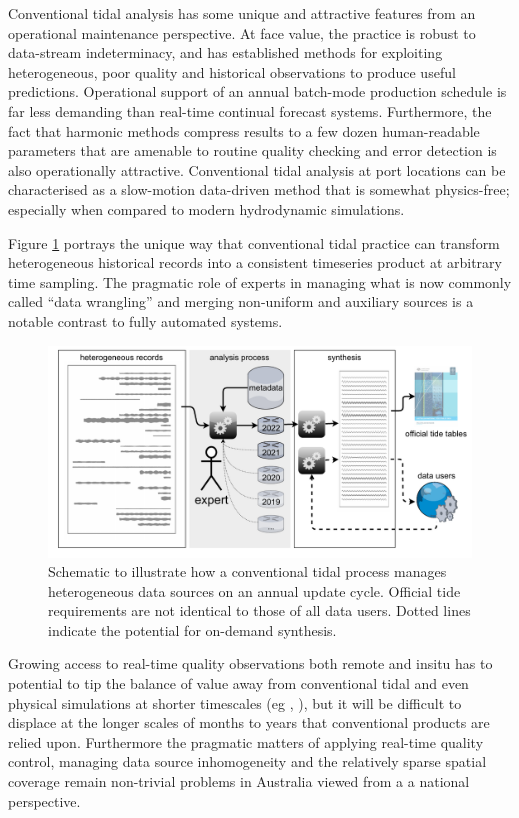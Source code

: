 Conventional tidal analysis has some unique and attractive features from an operational maintenance perspective.
At face value, the practice is robust to data-stream indeterminacy,  and has established methods for exploiting heterogeneous, poor quality and historical observations to produce useful predictions.  
Operational support of an annual batch-mode production schedule is far less demanding than real-time continual forecast systems. 
Furthermore, the fact that harmonic methods compress results to a few dozen human-readable parameters that are amenable to routine quality checking and error detection is also operationally attractive. 
Conventional tidal analysis at port locations can be characterised as a slow-motion data-driven method that is somewhat physics-free; especially when compared to modern hydrodynamic simulations. 

Figure \ref{fig:tidePractice} portrays the unique way that conventional tidal practice can transform heterogeneous historical records into a consistent timeseries product at arbitrary time sampling.
The pragmatic role of experts in managing what is now commonly  called ``data wrangling'' and merging non-uniform and auxiliary sources is a notable contrast to fully automated systems.
 
\begin{figure}[H]\centering
        \includegraphics[width=\figwidthFull]{figures/diagrams/tideSchematic.pdf} 
        \caption{Schematic to illustrate how a conventional tidal process manages heterogeneous data sources on an annual update cycle.  Official tide requirements are not identical to those of all data users.  Dotted lines indicate the potential for on-demand synthesis.}
        \label{fig:tidePractice}
\end{figure}   


Growing access to real-time quality observations both remote and insitu has to potential to tip the balance of value away from conventional tidal and even physical simulations at shorter timescales (eg \citep{10.3389/fmars.2019.00437}, \citep{10.3389/fmars.2020.00260} ), but it will be difficult to displace at the longer scales of months to years that conventional products are relied upon.
Furthermore the pragmatic matters of applying real-time quality control, managing data source inhomogeneity and the relatively sparse spatial coverage remain non-trivial problems in Australia viewed from a a national perspective.


